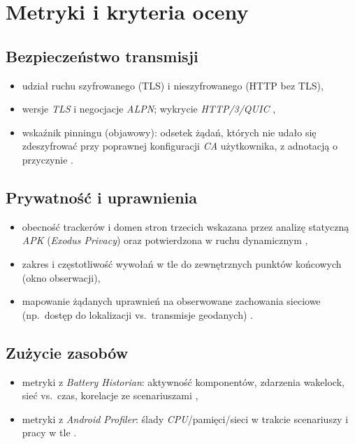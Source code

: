 \section{Metryki i kryteria oceny}

\subsection{Bezpieczeństwo transmisji}
\begin{itemize}
  \item udział ruchu szyfrowanego (TLS) i nieszyfrowanego (HTTP bez TLS),
  \item wersje \emph{TLS} i negocjacje \emph{ALPN}; wykrycie \emph{HTTP/3/QUIC} \cite{RFC8446,RFC9114,RFC9000},
  \item wskaźnik pinningu (objawowy): odsetek żądań, których nie udało się zdeszyfrować przy poprawnej konfiguracji \emph{CA} użytkownika, z adnotacją o przyczynie \cite{OWASPMASTGPinning,OWASPMASTGIntercept}.
\end{itemize}

\subsection{Prywatność i uprawnienia}
\begin{itemize}
  \item obecność trackerów i domen stron trzecich wskazana przez analizę statyczną \emph{APK} (\textit{Exodus Privacy}) oraz potwierdzona w ruchu dynamicznym \cite{ExodusPrivacy},
  \item zakres i częstotliwość wywołań w tle do zewnętrznych punktów końcowych (okno obserwacji),
  \item mapowanie żądanych uprawnień na obserwowane zachowania sieciowe (np.\ dostęp do lokalizacji vs.\ transmisje geodanych) \cite{AndroidPermissionsOverview,PrivacySandboxAndroid}.
\end{itemize}

\subsection{Zużycie zasobów}
\begin{itemize}
  \item metryki z \textit{Battery Historian}: aktywność komponentów, zdarzenia wakelock, sieć vs.\ czas, korelacje ze scenariuszami \cite{BatteryHistorian},
  \item metryki z \textit{Android Profiler}: ślady \emph{CPU}/pamięci/sieci w trakcie scenariuszy i pracy w tle \cite{AndroidProfiler}.
\end{itemize}

